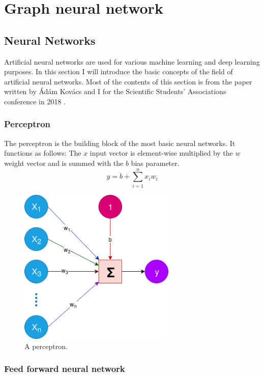 \chapter{Graph neural network}\label{sect:GraphNetwork}

\section{Neural Networks}
Artificial neural networks are used for various machine learning and deep learning purposes. In this section I will introduce the basic concepts of the field of artificial neural networks.
Most of the contents of this section is from the paper written by \'Ad\'am Kov\'acs and I for the Scientific Students' Associations conference in 2018 \cite{SemParse}.

\subsection{Perceptron}
The perceptron is the building block of the most basic neural networks. It functions as follows: The \(x\) input vector is element-wise multiplied by the \(w\) weight vector and is summed with the \(b\) bias parameter.
\[y = b + \sum_{i=1}^{n} x_i w_i\]

\begin{figure}[!ht]
	\centering
	\includegraphics[width=75mm, keepaspectratio]{figures/perceptron.png}
	\caption{A perceptron.}
	\label{fig:perceptron}
\end{figure}

\subsection{Feed forward neural network}

